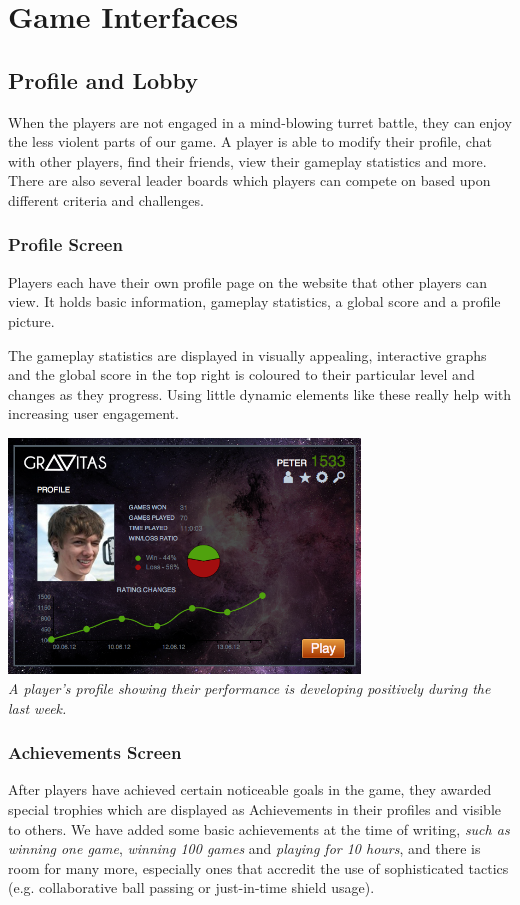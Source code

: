 \documentclass[a4wide, 11pt]{article}
\begin{document}
\section {Game Interfaces}
\subsection{Profile and Lobby}
When the players are not engaged in a mind-blowing turret battle, they can enjoy the less violent parts of our game. A player is able to modify their profile, chat with other players, find their friends, view their gameplay statistics and more. There are also several leader boards which players can compete on based upon different criteria and challenges.

\subsubsection{Profile Screen}
Players each have their own profile page on the website that other players can view. It holds basic information, gameplay statistics, a global score and a profile picture.

The gameplay statistics are displayed in visually appealing, interactive graphs and the global score in the top right is coloured to their particular level and changes as they progress. Using little dynamic elements like these really help with increasing user engagement.

\begin{center}

    \includegraphics[width=0.7\textwidth]{images/profile.png} \\
  \emph{A player's profile showing their performance is developing positively during the last week.}
\end{center}

\subsubsection{Achievements Screen}
After players have achieved certain noticeable goals in the game, they awarded special trophies which are displayed as Achievements in their profiles and visible to others.
We have added some basic achievements at the time of writing, \emph{such as winning one game}, \emph{winning 100 games} and\emph{ playing for 10 hours}, and there is room for many more, especially ones that accredit the use of sophisticated tactics (e.g. collaborative ball passing or just-in-time shield usage).
\end{document}
